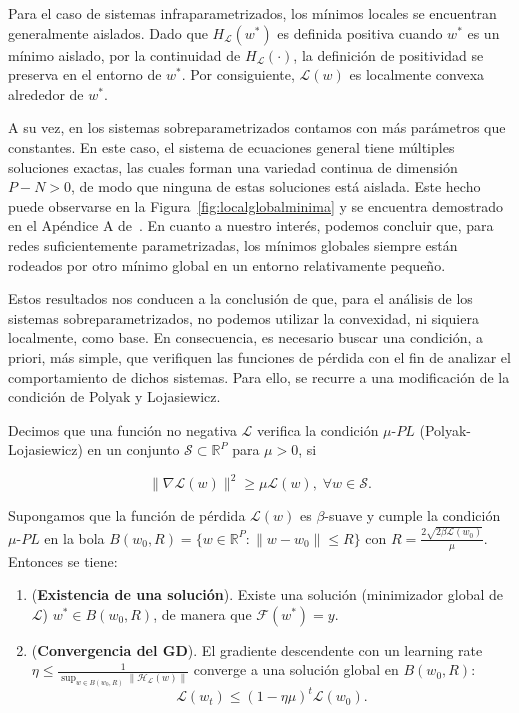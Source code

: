 Para el caso de sistemas infraparametrizados, los mínimos locales se encuentran generalmente aislados. Dado que $H_{\mathcal{L}}(w^{*})$ es definida positiva cuando $w^{*}$ es un mínimo aislado, por la continuidad de $H_{\mathcal{L}}(\cdot)$, la definición de positividad se preserva en el entorno de $w^{*}$. Por consiguiente, $\mathcal{L}(w)$ es localmente convexa alrededor de $w^{*}$.

A su vez, en los sistemas sobreparametrizados contamos con más parámetros que constantes. En este caso, el sistema de ecuaciones general tiene múltiples soluciones exactas, las cuales forman una variedad continua de dimensión $P - N > 0$, de modo que ninguna de estas soluciones está aislada. Este hecho puede observarse en la Figura~\ref{fig:localglobalminima} y se encuentra demostrado en el Apéndice A de~\cite{Liu2021}. En cuanto a nuestro interés, podemos concluir que, para redes suficientemente parametrizadas, los mínimos globales siempre están rodeados por otro mínimo global en un entorno relativamente pequeño.

Estos resultados nos conducen a la conclusión de que, para el análisis de los sistemas sobreparametrizados, no podemos utilizar la convexidad, ni siquiera localmente, como base. En consecuencia, es necesario buscar una condición, a priori, más simple, que verifiquen las funciones de pérdida con el fin de analizar el comportamiento de dichos sistemas. Para ello, se recurre a una modificación de la condición de Polyak y Lojasiewicz.

\begin{definicion}[Condición $\mu$-$PL$]
    Decimos que una función no negativa $\mathcal{L}$ verifica la condición $\mu$-$PL$ (Polyak-Lojasiewicz) en un conjunto $\mathcal{S} \subset \mathbb{R}^{P}$ para $\mu > 0$, si

    \[
        \| \nabla \mathcal{L}(w) \|^{2} \geq \mu \mathcal{L}(w), \; \forall w \in \mathcal{S}.
    \]
\end{definicion}

\begin{teorema}
    Supongamos que la función de pérdida $\mathcal{L}(w)$ es $\beta$-suave y cumple la condición $\mu$-$PL$ en la bola $B(w_0, R) = \{ w \in \mathbb{R}^{P} : \| w - w_0 \| \leq R \}$ con $R = \frac{2 \sqrt{2 \beta \mathcal{L}(w_0)}}{\mu}$. Entonces se tiene:

    \begin{enumerate}
        \item (\textbf{Existencia de una solución}). Existe una solución (minimizador global de $\mathcal{L}$) $w^{*} \in B(w_0, R)$, de manera que $\mathcal{F}(w^{*}) = y$.
        \item (\textbf{Convergencia del GD}). El gradiente descendente con un learning rate $\eta \leq \frac{1}{\sup_{w \in B(w_0, R)} \| \mathcal{H}_{\mathcal{L}}(w) \|}$ converge a una solución global en $B(w_0, R)$:
        \[
            \mathcal{L}(w_{t}) \leq (1 - \eta \mu)^{t} \mathcal{L}(w_0).
        \]
    \end{enumerate}
\end{teorema}

